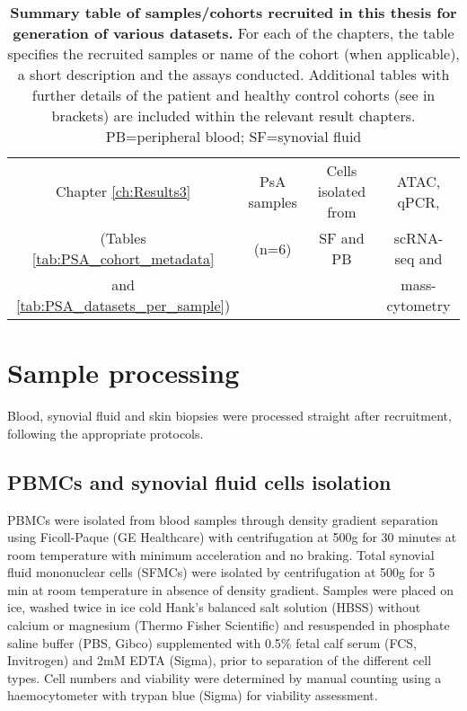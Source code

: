 \begin{table}[htbp]
\begin{tabular}{@{} c c c c}
\midrule																							
Chapter \ref{ch:Results3}											& PsA samples      & Cells isolated from                         & ATAC, qPCR,         \\
(Tables \ref{tab:PSA_cohort_metadata}					& (n=6)            & SF and PB                                   & scRNA-seq and       \\
and \ref{tab:PSA_datasets_per_sample})			  &                  &                                             & mass-cytometry      \\
\bottomrule
\end{tabular}
\medskip %
\caption[Summary table of samples/cohorts recruited in this thesis for generation of various datasets.]{\textbf{Summary table of samples/cohorts recruited in this thesis for generation of various datasets.} For each of the chapters, the table specifies the recruited samples or name of the cohort (when applicable), a short description and the assays conducted. Additional tables with further details of the patient and healthy control cohorts (see in brackets) are included within the relevant result chapters. PB=peripheral blood; SF=synovial fluid}
\label{tab:Summary_all_cohorts}
\end{table}
\bigskip %



\section{Sample processing}
\label{sample_processing}
Blood, synovial fluid and skin biopsies were processed straight after recruitment, following the appropriate protocols.

\subsection{PBMCs and synovial fluid cells isolation}
PBMCs were isolated from blood samples through density gradient separation using Ficoll-Paque (GE Healthcare) with centrifugation at 500g for 30 minutes at room temperature with minimum acceleration and no braking. Total synovial fluid mononuclear cells (SFMCs) were isolated by centrifugation at 500g for 5 min at room temperature in absence of density gradient. Samples were placed on ice, washed twice in ice cold Hank’s balanced salt solution (HBSS) without calcium or magnesium (Thermo Fisher Scientific) and resuspended in phosphate saline buffer (PBS, Gibco) supplemented with 0.5\% fetal calf serum (FCS, Invitrogen) and 2mM EDTA (Sigma), prior to separation of the different cell types. Cell numbers and viability were determined by manual counting using a haemocytometer with trypan blue (Sigma) for viability assessment.


